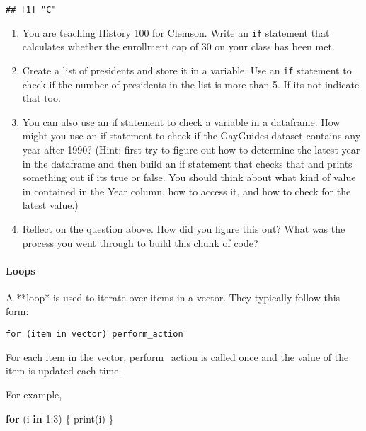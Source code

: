 \documentclass[
]{article}
\newenvironment{Shaded}{\begin{snugshade}}{\end{snugshade}}
\newcommand{\ControlFlowTok}[1]{\textcolor[rgb]{0.13,0.29,0.53}{\textbf{#1}}}
\newcommand{\DecValTok}[1]{\textcolor[rgb]{0.00,0.00,0.81}{#1}}
\newcommand{\FunctionTok}[1]{\textcolor[rgb]{0.00,0.00,0.00}{#1}}
\newcommand{\NormalTok}[1]{#1}
\newcommand{\SpecialCharTok}[1]{\textcolor[rgb]{0.00,0.00,0.00}{#1}}
\begin{document}
\begin{verbatim}
## [1] "C"
\end{verbatim}

\begin{enumerate}
\def\labelenumi{(\arabic{enumi})}
\setcounter{enumi}{11}
\item
  You are teaching History 100 for Clemson. Write an \texttt{if}
  statement that calculates whether the enrollment cap of 30 on your
  class has been met.
\item
  Create a list of presidents and store it in a variable. Use an
  \texttt{if} statement to check if the number of presidents in the list
  is more than 5. If its not indicate that too.
\item
  You can also use an if statement to check a variable in a dataframe.
  How might you use an if statement to check if the GayGuides dataset
  contains any year after 1990? (Hint: first try to figure out how to
  determine the latest year in the dataframe and then build an if
  statement that checks that and prints something out if its true or
  false. You should think about what kind of value in contained in the
  Year column, how to access it, and how to check for the latest value.)
\item
  Reflect on the question above. How did you figure this out? What was
  the process you went through to build this chunk of code?
\end{enumerate}

\begin{quote}
\end{quote}

\hypertarget{loops}{%
\paragraph{Loops}\label{loops}}

A **loop* is used to iterate over items in a vector. They typically
follow this form:

\begin{verbatim}
for (item in vector) perform_action
\end{verbatim}

For each item in the vector, perform\_action is called once and the
value of the item is updated each time.

For example,

\begin{Shaded}
\begin{Highlighting}[]
\ControlFlowTok{for}\NormalTok{ (i }\ControlFlowTok{in} \DecValTok{1}\SpecialCharTok{:}\DecValTok{3}\NormalTok{) \{}
  \FunctionTok{print}\NormalTok{(i)}
\NormalTok{\}}
\end{Highlighting}
\end{Shaded}
\end{document}
